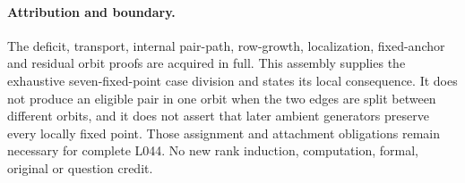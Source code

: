 \documentclass[11pt,a4paper]{article}
\begin{document}
\paragraph{Attribution and boundary.}
The deficit, transport, internal pair-path, row-growth,
localization, fixed-anchor and residual orbit proofs
are acquired in full. This assembly supplies the
exhaustive seven-fixed-point case division and states
its local consequence. It does not produce an eligible
pair in one orbit when the two edges are split between
different orbits, and it does not assert that later
ambient generators preserve every locally fixed point.
Those assignment and attachment obligations remain
necessary for complete L044. No new rank induction,
computation, formal, original or question credit.
\end{document}
